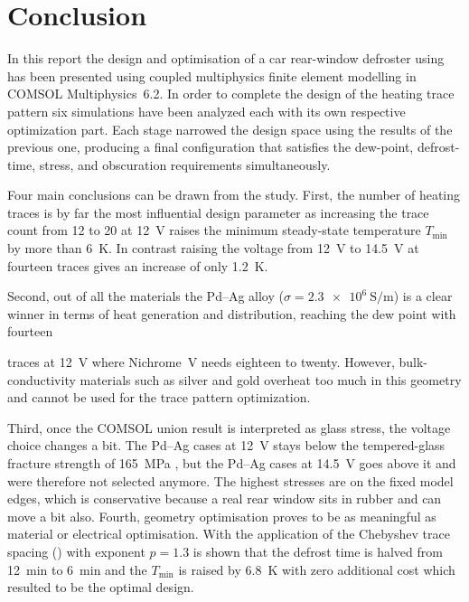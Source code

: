 \section{Conclusion}
\label{ch:conclusion}

In this report the design and optimisation of a car rear-window defroster using has been presented using coupled
multiphysics finite element modelling in COMSOL Multiphysics~6.2. In order to complete the design of the heating trace 
pattern six simulations have been analyzed each with its own respective optimization part.  Each stage narrowed 
the design space using the results of the previous one, 
producing a final configuration that satisfies the dew-point, defrost-time, stress, and obscuration requirements 
simultaneously.

Four main conclusions can be drawn from the study. First, the number of heating traces is by far the most 
influential design parameter as increasing the trace count from 12 to 20 at \SI{12}{\volt} raises the 
minimum steady-state temperature $T_\text{min}$ by more than \SI{6}{\kelvin}. In contrast raising the 
voltage from \SI{12}{\volt} to \SI{14.5}{\volt} at fourteen traces gives an increase of only \SI{1.2}{\kelvin}. 

Second, out of all the materials the Pd--Ag alloy ($\sigma = \SI{2.3e6}{\siemens\per\metre}$) 
is a clear winner in terms of heat generation and distribution, reaching the dew point with fourteen 

traces at \SI{12}{\volt} where Nichrome~V needs eighteen to twenty. However, bulk-conductivity materials 
such as silver and gold overheat too much in this geometry and cannot be used for the trace pattern optimization. 

Third, once the COMSOL union result is interpreted as glass stress, the voltage choice changes a bit. The Pd--Ag cases at \SI{12}{\volt} stays below the tempered-glass fracture strength of \SI{165}{\mega\pascal} \cite{astmc1048}, but the Pd--Ag cases at \SI{14.5}{\volt} goes above it and were therefore not selected anymore. The highest stresses are on the fixed model edges, which is conservative because a real rear window sits in rubber and can move a bit also. 
Fourth, geometry optimisation proves to be as meaningful as material or 
electrical optimisation. With the application of the Chebyshev trace spacing () with exponent 
$p = 1.3$ is shown that the defrost time is halved from \SI{12}{\minute} to \SI{6}{\minute} and the 
$T_\text{min}$ is raised by \SI{6.8}{\kelvin} with zero additional cost which resulted to be the optimal design.





